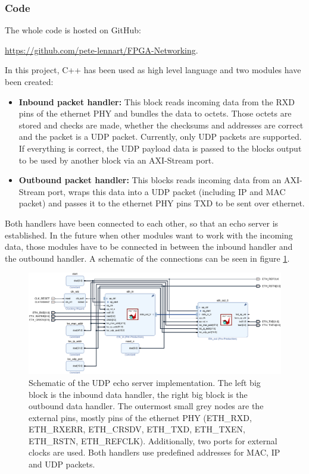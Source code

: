 \subsubsection{Code}
The whole code is hosted on GitHub:
\begin{center}
    \url{https://github.com/pete-lennart/FPGA-Networking}.
\end{center}
In this project, C++ has been used as high level language and two modules have been created:
\begin{itemize}
  \item \textbf{Inbound packet handler:} This block reads incoming data from the RXD pins of the ethernet PHY and bundles the data to octets. Those octets are stored and checks are made, whether the checksums and addresses are correct and the packet is a UDP packet. Currently, only UDP packets are supported. If everything is correct, the UDP payload data is passed to the blocks output to be used by another block via an AXI-Stream port.
  \item \textbf{Outbound packet handler:} This blocks reads incoming data from an AXI-Stream port, wraps this data into a UDP packet (including IP and MAC packet) and passes it to the ethernet PHY pins TXD to be sent over ethernet.
\end{itemize}
Both handlers have been connected to each other, so that an echo server is established. In the future when other modules want to work with the incoming data, those modules have to be connected in between the inbound handler and the outbound handler.
A schematic of the connections can be seen in figure \ref{figure:schematic}.

\begin{figure}
  \includegraphics[width=\textwidth]{assets/schematic.png}
  \caption[Schematic of the UDP echo server implementation]{Schematic of the UDP echo server implementation. The left big block is the inbound data handler, the right big block is the outbound data handler. The outermost small grey nodes are the external pins, mostly pins of the ethernet PHY (ETH\_RXD, ETH\_RXERR, ETH\_CRSDV, ETH\_TXD, ETH\_TXEN, ETH\_RSTN, ETH\_REFCLK). Additionally, two ports for external clocks are used. Both handlers use predefined addresses for MAC, IP and UDP packets.}
  \label{figure:schematic}
\end{figure}

